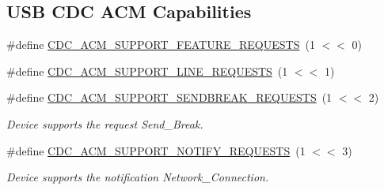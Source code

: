 \subsection*{\-U\-S\-B \-C\-D\-C \-A\-C\-M \-Capabilities}
\begin{DoxyCompactItemize}
\item 
\#define \hyperlink{group__cdc__protocol__group_gab1dab8b998f3a80f796edaf74567d4a7}{\-C\-D\-C\-\_\-\-A\-C\-M\-\_\-\-S\-U\-P\-P\-O\-R\-T\-\_\-\-F\-E\-A\-T\-U\-R\-E\-\_\-\-R\-E\-Q\-U\-E\-S\-T\-S}~(1 $<$$<$ 0)
\item 
\#define \hyperlink{group__cdc__protocol__group_gacba280f60d9dacf049a41a6711b1e9b2}{\-C\-D\-C\-\_\-\-A\-C\-M\-\_\-\-S\-U\-P\-P\-O\-R\-T\-\_\-\-L\-I\-N\-E\-\_\-\-R\-E\-Q\-U\-E\-S\-T\-S}~(1 $<$$<$ 1)
\item 
\#define \hyperlink{group__cdc__protocol__group_ga5e20369c655ed417fb699944b064ebdc}{\-C\-D\-C\-\_\-\-A\-C\-M\-\_\-\-S\-U\-P\-P\-O\-R\-T\-\_\-\-S\-E\-N\-D\-B\-R\-E\-A\-K\-\_\-\-R\-E\-Q\-U\-E\-S\-T\-S}~(1 $<$$<$ 2)
\begin{DoxyCompactList}\small\item\em \-Device supports the request \-Send\-\_\-\-Break. \end{DoxyCompactList}\item 
\#define \hyperlink{group__cdc__protocol__group_gac7cc3782b884395213a99ffae74b159f}{\-C\-D\-C\-\_\-\-A\-C\-M\-\_\-\-S\-U\-P\-P\-O\-R\-T\-\_\-\-N\-O\-T\-I\-F\-Y\-\_\-\-R\-E\-Q\-U\-E\-S\-T\-S}~(1 $<$$<$ 3)
\begin{DoxyCompactList}\small\item\em \-Device supports the notification \-Network\-\_\-\-Connection. \end{DoxyCompactList}\end{DoxyCompactItemize}


